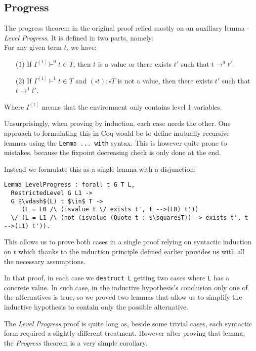\documentclass[runningheads]{article}
\begin{document}
\subsection{Progress}

The progress theorem in the original proof relied mostly on an auxiliary lemma - \textit{Level Progress}. It is defined in two parts, namely:
\\
For any given term $t$, we have:
\begin{itemize}
  \item[(1)]  If $\Gamma^{[1]} \vdash^0 t \in T$, then $t$ is a value or  there exists $t'$ such that $t \longrightarrow^0 t'$.
  \item[(2)] If $\Gamma^{[1]} \vdash^1 t \in T$ and $(\square t) : \square T$ is not a value,  then there exists $t'$ such that $t \longrightarrow^1 t'$.
\end{itemize}
Where $\Gamma^{[1]}$ means that the environment only contains level 1 variables.

Unsurprisingly, when proving by induction, each case needs the other. One approach to formulating this in Coq would be to define mutually recursive lemmas using the \verb|Lemma ... with| syntax. This is however quite prone to mistakes, because the fixpoint decreasing check is only done at the end.

Instead we formulate this as a single lemma with a disjunction:
\begin{lstlisting}[mathescape=true]
Lemma LevelProgress : forall t G T L,
  RestrictedLevel G L1 ->
  G $\vdash$(L) t $\in$ T ->
     (L = L0 /\ (isvalue t \/ exists t', t -->(L0) t')) 
  \/ (L = L1 /\ (not (isvalue (Quote t : $\square$T)) -> exists t', t -->(L1) t')).
\end{lstlisting}

This allows us to prove both cases in a single proof relying on syntactic induction on $t$ which thanks to the induction principle defined earlier provides us with all the necessary assumptions.

In that proof, in each case we \verb|destruct L| getting two cases where \verb|L| has a concrete value. In such case, in the inductive hypothesis's conclusion only one of the alternatives is true, so we proved two lemmas that allow us to simplify the inductive hypothesis to contain only the possible alternative.

The \textit{Level Progress} proof is quite long as, beside some trivial cases, each syntactic form required a slightly different treatment. However after proving that lemma, the \textit{Progress} theorem is a very simple corollary.
\end{document}
